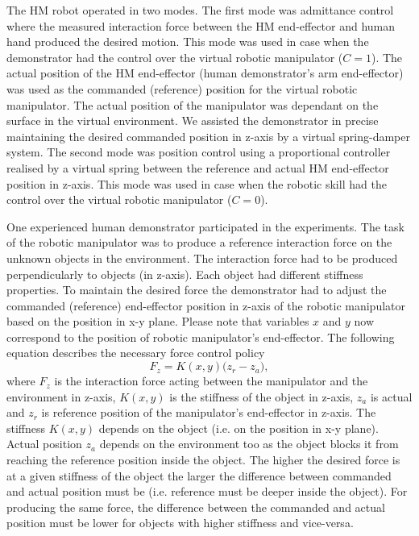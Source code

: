 The HM robot operated in two modes. The first mode was admittance control where the measured interaction force between the HM end-effector and human hand produced the desired motion. This mode was used in case when the demonstrator had the control over the virtual robotic manipulator ($C=1$). The actual position of the HM end-effector (human demonstrator's arm end-effector) was used as the commanded (reference) position for the virtual robotic manipulator. The actual position of the manipulator was dependant on the surface in the virtual environment. We assisted the demonstrator in precise maintaining the desired commanded position in z-axis by a virtual spring-damper system. The second mode was position control using a proportional controller realised by a virtual spring between the reference and actual HM end-effector position in z-axis. This mode was used in case when the robotic skill had the control over the virtual robotic manipulator ($C=0$).

One experienced human demonstrator participated in the experiments. The task of the robotic manipulator was to produce a reference interaction force on the unknown objects in the environment. The interaction force had to be produced perpendicularly to objects (in z-axis). Each object had different stiffness properties. To maintain the desired force the demonstrator had to adjust the commanded (reference) end-effector position in z-axis of the robotic manipulator based on the position in x-y plane. Please note that variables $x$ and $y$ now correspond to the position of robotic manipulator's end-effector. The following equation describes the necessary force control policy
\begin{equation}
	F_{z} = K(x,y) \big(z_r-z_a\big),\label{en:robotimp}
\end{equation}
where $F_{z}$ is the interaction force acting between the manipulator and the environment in z-axis, $K(x,y)$ is the stiffness of the object in z-axis, $z_a$ is actual and $z_r$ is reference position of the manipulator's end-effector in z-axis. The stiffness $K(x,y)$ depends on the object (i.e. on the position in x-y plane). Actual position $z_a$ depends on the environment too as the object blocks it from reaching the reference position inside the object. The higher the desired force is at a given stiffness of the object the larger the difference between commanded and actual position must be (i.e. reference must be deeper inside the object). For producing the same force, the difference between the commanded and actual position must be lower for objects with higher stiffness and vice-versa.

